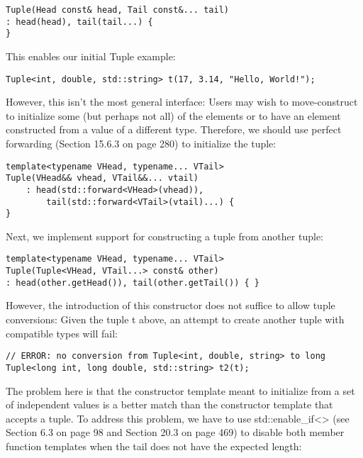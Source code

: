 \begin{lstlisting}[style=styleCXX]
Tuple(Head const& head, Tail const&... tail)
: head(head), tail(tail...) {
}
\end{lstlisting}

This enables our initial Tuple example:

\begin{lstlisting}[style=styleCXX]
Tuple<int, double, std::string> t(17, 3.14, "Hello, World!");
\end{lstlisting}

However, this isn’t the most general interface: Users may wish to move-construct to initialize some (but perhaps not all) of the elements or to have an element constructed from a value of a different type. Therefore, we should use perfect forwarding (Section 15.6.3 on page 280) to initialize the tuple:

\begin{lstlisting}[style=styleCXX]
template<typename VHead, typename... VTail>
Tuple(VHead&& vhead, VTail&&... vtail)
	: head(std::forward<VHead>(vhead)),
		tail(std::forward<VTail>(vtail)...) {
}
\end{lstlisting}

Next, we implement support for constructing a tuple from another tuple:

\begin{lstlisting}[style=styleCXX]
template<typename VHead, typename... VTail>
Tuple(Tuple<VHead, VTail...> const& other)
: head(other.getHead()), tail(other.getTail()) { }
\end{lstlisting}

However, the introduction of this constructor does not suffice to allow tuple conversions: Given the tuple t above, an attempt to create another tuple with compatible types will fail:

\begin{lstlisting}[style=styleCXX]
// ERROR: no conversion from Tuple<int, double, string> to long
Tuple<long int, long double, std::string> t2(t);
\end{lstlisting}

The problem here is that the constructor template meant to initialize from a set of independent values is a better match than the constructor template that accepts a tuple. To address this problem, we have to use std::enable\_if<> (see Section 6.3 on page 98 and Section 20.3 on page 469) to disable both member function templates when the tail does not have the expected length:

